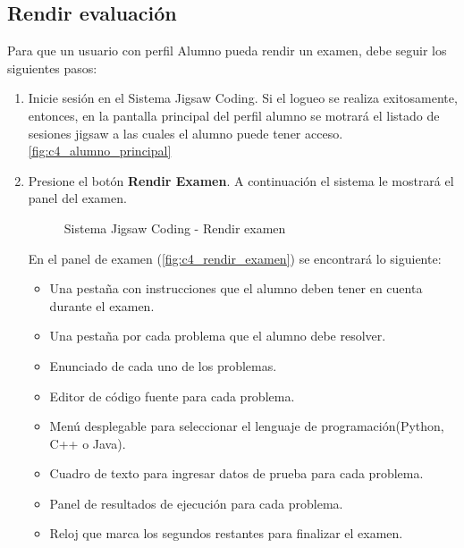\subsection{Rendir evaluación}
Para que un usuario con perfil Alumno pueda rendir un examen, debe seguir los siguientes pasos:

\begin{enumerate}
	\item Inicie sesión en el Sistema Jigsaw Coding. Si el logueo se realiza exitosamente, entonces, en la pantalla principal del perfil alumno se motrará el listado de sesiones jigsaw a las cuales el alumno puede tener acceso.\autoref{fig:c4_alumno_principal}
	\item Presione el botón \textbf{Rendir Examen}. A continuación el sistema le mostrará el panel del examen.
	
	\begin{figure}
		\centering
		\caption{Sistema Jigsaw Coding - Rendir examen}
		\label{fig:c4_rendir_examen}
	\end{figure}
	
	En el panel de examen  (\autoref{fig:c4_rendir_examen}) se encontrará lo siguiente: 
	
	\begin{itemize}
		\item Una pestaña con instrucciones que el alumno deben tener en cuenta durante el examen.
		\item Una pestaña por cada problema que el alumno debe resolver.
		\item Enunciado de cada uno de los problemas.
		\item Editor de código fuente para cada problema.
		\item Menú desplegable para seleccionar el lenguaje de programación(Python, C++ o Java).
		\item Cuadro de texto para ingresar datos de prueba para cada problema.
		\item Panel de resultados de ejecución para cada problema.
		\item Reloj que marca los segundos restantes para finalizar el examen.
	\end{itemize}
	

\end{enumerate}
